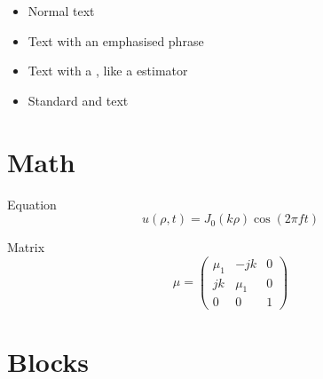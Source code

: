 \documentclass[aspectratio=169]{beamer}
\begin{document}
\begin{frame}{\secname}
  \begin{itemize}
    \item Normal text
    \item Text with an \alert{emphasised phrase}
    \item Text with a , like a  estimator
    \item Standard and  text
  \end{itemize}
\end{frame}

 \section{Math}
 \begin{frame}{\secname}{Equation}
   \centering
   \Huge
   $$
   u(\rho,t) = J_0(k\rho) \cos(2\pi f t)
   $$
 \end{frame}

 \begin{frame}{\secname}{Matrix}
   \centering
   \Huge
   $$
   \mu = \left(
     \begin{array}{ccc}
       \mu_{1} & -jk & 0 \\
       jk & \mu_{1} & 0 \\
       0 & 0 & 1
     \end{array}
   \right)
   $$
 \end{frame}

 \section{Blocks}
 \begin{frame}{\secname}
 \end{frame}
\end{document}
